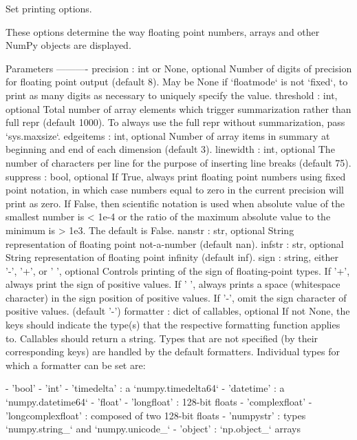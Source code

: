 \begin{DoxyVerb}Set printing options.

These options determine the way floating point numbers, arrays and
other NumPy objects are displayed.

Parameters
----------
precision : int or None, optional
    Number of digits of precision for floating point output (default 8).
    May be None if `floatmode` is not `fixed`, to print as many digits as
    necessary to uniquely specify the value.
threshold : int, optional
    Total number of array elements which trigger summarization
    rather than full repr (default 1000).
    To always use the full repr without summarization, pass `sys.maxsize`.
edgeitems : int, optional
    Number of array items in summary at beginning and end of
    each dimension (default 3).
linewidth : int, optional
    The number of characters per line for the purpose of inserting
    line breaks (default 75).
suppress : bool, optional
    If True, always print floating point numbers using fixed point
    notation, in which case numbers equal to zero in the current precision
    will print as zero.  If False, then scientific notation is used when
    absolute value of the smallest number is < 1e-4 or the ratio of the
    maximum absolute value to the minimum is > 1e3. The default is False.
nanstr : str, optional
    String representation of floating point not-a-number (default nan).
infstr : str, optional
    String representation of floating point infinity (default inf).
sign : string, either '-', '+', or ' ', optional
    Controls printing of the sign of floating-point types. If '+', always
    print the sign of positive values. If ' ', always prints a space
    (whitespace character) in the sign position of positive values.  If
    '-', omit the sign character of positive values. (default '-')
formatter : dict of callables, optional
    If not None, the keys should indicate the type(s) that the respective
    formatting function applies to.  Callables should return a string.
    Types that are not specified (by their corresponding keys) are handled
    by the default formatters.  Individual types for which a formatter
    can be set are:

    - 'bool'
    - 'int'
    - 'timedelta' : a `numpy.timedelta64`
    - 'datetime' : a `numpy.datetime64`
    - 'float'
    - 'longfloat' : 128-bit floats
    - 'complexfloat'
    - 'longcomplexfloat' : composed of two 128-bit floats
    - 'numpystr' : types `numpy.string_` and `numpy.unicode_`
    - 'object' : `np.object_` arrays


\end{DoxyVerb}
